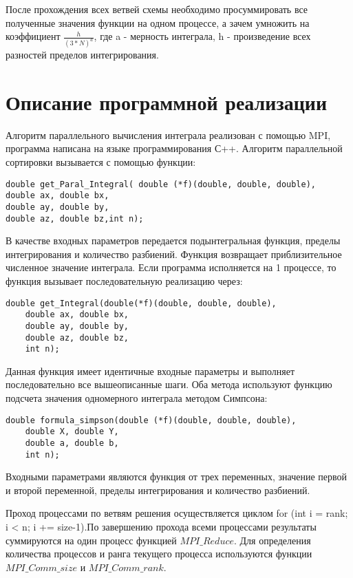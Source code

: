 \documentclass{report}
\begin{document}
\par После прохождения всех ветвей схемы необходимо просуммировать все полученные значения функции на одном процессе, а зачем умножить на коэффициент $\displaystyle \frac{h}{(3*N)^a}$, где a - мерность интеграла, h - произведение всех разностей пределов интегрирования.

\newpage


\section*{Описание программной реализации}
Алгоритм параллельного вычисления интеграла реализован с помощью MPI, программа написана на языке программирования С++. Алгоритм параллельной сортировки вызывается с помощью функции:
\begin{lstlisting}
double get_Paral_Integral( double (*f)(double, double, double),
double ax, double bx, 
double ay, double by,
double az, double bz,int n);
\end{lstlisting}
\par В качестве входных параметров передается подынтегральная функция, пределы интегрирования и количество разбиений. Функция возвращает приблизительное численное значение интеграла. Если программа исполняется на 1 процессе, то функция вызывает последовательную реализацию через:
\begin{lstlisting}
double get_Integral(double(*f)(double, double, double),
    double ax, double bx,
    double ay, double by,
    double az, double bz,
    int n);
\end{lstlisting}
\par Данная функция имеет идентичные входные параметры и выполняет последовательно все вышеописанные шаги. Оба метода используют функцию подсчета значения одномерного интеграла методом Симпсона:
\begin{lstlisting}
double formula_simpson(double (*f)(double, double, double),
    double X, double Y,
    double a, double b,
    int n);
\end{lstlisting}
Входными параметрами являются функция от трех переменных, значение первой и второй переменной, пределы интегрирования и количество разбиений.

\par Проход процессами по ветвям решения осуществляется циклом for (int i = rank; i < n; i += size-1).По завершению прохода всеми процессами результаты суммируются на один процесс функцией $MPI\_Reduce$. Для определения количества процессов и ранга текущего процесса используются функции $MPI\_Comm\_size$ и $MPI\_Comm\_rank$.
\end{document}
